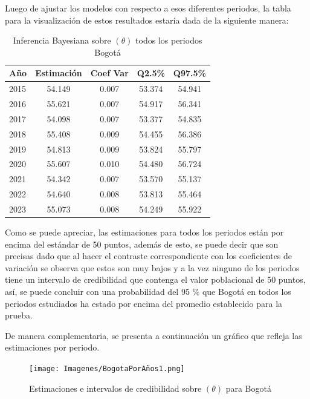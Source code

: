 \documentclass[12pt]{article}
\begin{document}
Luego de ajustar los modelos con respecto a esos diferentes periodos, la tabla para la visualización de estos resultados estaría dada de la siguiente manera:

\begin{table}[H]
\centering
\begin{tabular}{lcccc}
\hline
\textbf{Año} & \textbf{Estimación} & \textbf{Coef Var} & \textbf{Q2.5\%} & \textbf{Q97.5\%} \\
\hline
2015 & 54.149 & 0.007 & 53.374 & 54.941 \\
2016 & 55.621 & 0.007 & 54.917 & 56.341 \\
2017 & 54.098 & 0.007 & 53.377 & 54.835 \\
2018 & 55.408 & 0.009 & 54.455 & 56.386 \\
2019 & 54.813 & 0.009 & 53.824 & 55.797 \\
2020 & 55.607 & 0.010 & 54.480 & 56.724 \\
2021 & 54.342 & 0.007 & 53.570 & 55.137 \\
2022 & 54.640 & 0.008 & 53.813 & 55.464 \\
2023 & 55.073 & 0.008 & 54.249 & 55.922 \\
\hline
\end{tabular}
\caption{Inferencia Bayesiana sobre $(\theta)$ todos los periodos Bogotá}
\label{tab:bogota-periodos}
\end{table}

Como se puede apreciar, las estimaciones para todos los periodos están por encima del estándar de 50 puntos, además de esto, se puede decir que son precisas dado que al hacer el contraste correspondiente con los coeficientes de variación se observa que estos son muy bajos y a la vez ninguno de los periodos tiene un intervalo de credibilidad que contenga el valor poblacional de 50 puntos, así, se puede concluir con una probabilidad del 95 $\%$ que Bogotá en todos los periodos estudiados ha estado por encima del promedio establecido para la prueba.

De manera complementaria, se presenta a continuación un gráfico que refleja las estimaciones por periodo.

\begin{figure}[H]
    \centering
    \texttt{[image: Imagenes/BogotaPorAños1.png]}
    \caption{Estimaciones e intervalos de credibilidad sobre $(\theta)$ para Bogotá}
    \label{fig_enter_label}
\end{figure}
\end{document}
